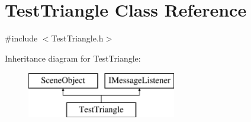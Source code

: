 \hypertarget{class_test_triangle}{}\section{Test\+Triangle Class Reference}
\label{class_test_triangle}


{\ttfamily \#include $<$Test\+Triangle.\+h$>$}

Inheritance diagram for Test\+Triangle\+:\begin{figure}[H]
\begin{center}
\leavevmode
\includegraphics[height=2.000000cm]{class_test_triangle}
\end{center}
\end{figure}
